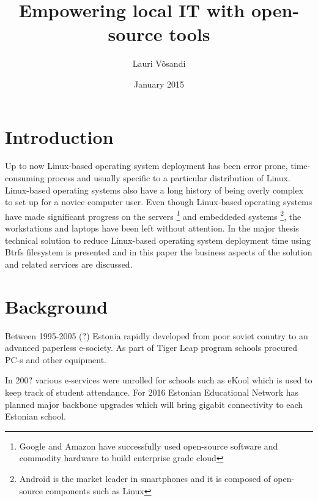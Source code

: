 \documentclass{article}
\title{Empowering local IT with open-source tools}
\author{Lauri Võsandi}
\date{January 2015}
\begin{document}
\maketitle

\section{Introduction}

Up to now Linux-based operating system deployment has been
error prone, time-consuming process and usually specific to
a particular distribution of Linux.
Linux-based operating systems also have a long history
of being overly complex to set up for a novice computer user.
Even though Linux-based operating systems have made significant
progress on the servers
\footnote{Google and Amazon have successfully used open-source software
and commodity hardware to build enterprise grade cloud}
and embeddeded systems
\footnote{Android is the market leader in smartphones and it is composed of open-source components such as Linux},
the workstations and laptops have been left without attention.
In the major thesis technical solution to reduce
Linux-based operating system deployment time using
Btrfs filesystem is presented and in this paper the business aspects
of the solution and related services are discussed.


\section{Background}


Between 1995-2005 (?) Estonia rapidly developed
from poor soviet country to an advanced paperless e-society.
As part of Tiger Leap program schools procured PC-s and
other equipment.


In 200? various e-services were unrolled for schools such as
eKool which is used to keep track of student attendance.
For 2016 Estonian Educational Network has planned major
backbone upgrades which will bring gigabit connectivity to each
Estonian school.
\end{document}

